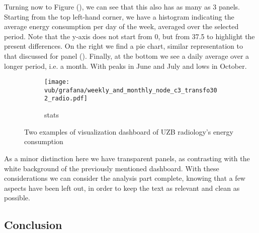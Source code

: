 Turning now to Figure (), we can see that this also has as many as 3 panels. Starting from the top left-hand corner, we have a histogram indicating the average energy consumption per day of the week, averaged over the selected period. 
Note that the y-axis does not start from 0, but from 37.5 to highlight the present differences. On the right we find a pie chart, similar representation to that discussed for panel ().
Finally, at the bottom we see a daily average over a longer period, i.e. a month. With peaks in June and July and lows in October. 
\begin{figure}    
    \ContinuedFloat
    \begin{subfigure}{\textwidth}
        \texttt{[image: vub/grafana/weekly\_and\_monthly\_node\_c3\_transfo302\_radio.pdf]}
        \caption{stats}
        \label{fig:vub_stats_v2}
    \end{subfigure}
    \caption{Two examples of visualization dashboard of \ac{UZB} radiology's energy consumption}
    \label{fig:vub_2_dashboard}
\end{figure}
As a minor distinction here we have transparent panels, as contrasting with the white background of the previously mentioned dashboard. 
With these considerations we can consider the analysis part complete, knowing that a few aspects have been left out, in order to keep the text as relevant and clean as possible.

\subsection{Conclusion}
